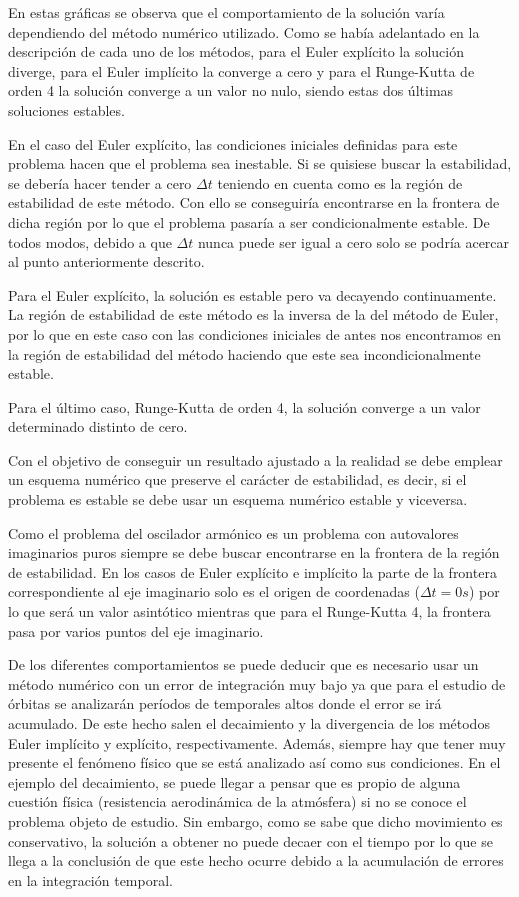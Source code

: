 \documentclass{article}
\begin{document}
	En estas gráficas se observa que el comportamiento de la solución varía dependiendo del método numérico utilizado. Como se había adelantado en la descripción de cada uno de los métodos, para el Euler explícito la solución diverge, para el Euler implícito la converge a cero y para el Runge-Kutta de orden 4 la solución converge a un valor no nulo, siendo estas dos últimas soluciones estables.
	
	En el caso del Euler explícito, las condiciones iniciales definidas para este problema hacen que el problema sea inestable. Si se quisiese buscar la estabilidad, se debería hacer tender a cero $\Delta t$ teniendo en cuenta como es la región de estabilidad de este método. Con ello se conseguiría encontrarse en la frontera de dicha región por lo que el problema pasaría a ser condicionalmente estable. De todos modos, debido a que $\Delta t$ nunca puede ser igual a cero solo se podría acercar al punto anteriormente descrito.
	
	Para el Euler explícito, la solución es estable pero va decayendo continuamente. La región de estabilidad de este método es la inversa de la del método de Euler, por lo que en este caso con las condiciones iniciales de antes nos encontramos en la región de estabilidad del método haciendo que este sea incondicionalmente estable.
	
	Para el último caso, Runge-Kutta de orden 4, la solución converge a un valor determinado distinto de cero.
	
	Con el objetivo de conseguir un resultado ajustado a la realidad se debe emplear un esquema numérico que preserve el carácter de estabilidad, es decir, si el problema es estable se debe usar un esquema numérico estable y viceversa.
	
	Como el problema del oscilador armónico es un problema con autovalores imaginarios puros siempre se debe buscar encontrarse en la frontera de la región de estabilidad. En los casos de Euler explícito e implícito la parte de la frontera correspondiente al eje imaginario solo es el origen de coordenadas ($\Delta t=0s$) por lo que será un valor asintótico mientras que para el Runge-Kutta 4, la frontera pasa por varios puntos del eje imaginario.
	
	De los diferentes comportamientos se puede deducir que es necesario usar un método numérico con un error de integración muy bajo ya que para el estudio de órbitas se analizarán períodos de temporales altos donde el error se irá acumulado. De este hecho salen el decaimiento y la divergencia de los métodos Euler implícito y explícito, respectivamente. Además, siempre hay que tener muy presente el fenómeno físico que se está analizado así como sus condiciones. En el ejemplo del decaimiento, se puede llegar a pensar que es propio de alguna cuestión física (resistencia aerodinámica de la atmósfera) si no se conoce el problema objeto de estudio. Sin embargo, como se sabe que dicho movimiento es conservativo, la solución a obtener no puede decaer con el tiempo por lo que se llega a la conclusión de que este hecho ocurre debido a la acumulación de errores en la integración temporal.
	
\end{document}
